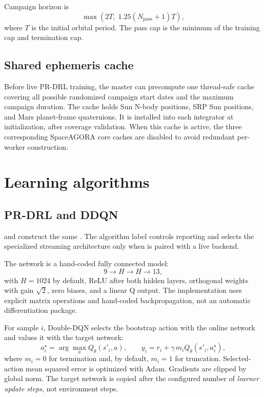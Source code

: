 \documentclass[11pt]{article}
\newcommand{\code}[1]{\texttt{\detokenize{#1}}}
\begin{document}
Campaign horizon is
\[
  \max\!\left(2T,\;1.25(N_{\mathrm{pass}}+1)T\right),
\]
where $T$ is the initial orbital period.  The pass cap is the minimum of the
training cap and termination cap.

\subsection{Shared ephemeris cache}

Before live PR-DRL training, the master can precompute one thread-safe cache
covering all possible randomized campaign start dates and the maximum
campaign duration.  The cache holds Sun N-body positions, SRP Sun positions,
and Mars planet-frame quaternions.  It is installed into each integrator at
initialization, after coverage validation.  When this cache is active, the
three corresponding SpaceAGORA core caches are disabled to avoid redundant
per-worker construction.

\section{Learning algorithms}

\subsection{PR-DRL and DDQN}

\code{pr_drl} and \code{ddqn} construct the same \code{DDQNLearner}.  The
algorithm label controls reporting and selects the specialized streaming
architecture only when \code{pr_drl} is paired with a live backend.

The network is a hand-coded fully connected model:
\[
  9 \longrightarrow H \longrightarrow H \longrightarrow 13,
\]
with $H=1024$ by default, ReLU after both hidden layers, orthogonal weights
with gain $\sqrt{2}$, zero biases, and a linear Q output.  The implementation
uses explicit matrix operations and hand-coded backpropagation, not an
automatic differentiation package.

For sample $i$, Double-DQN selects the bootstrap action with the online
network and values it with the target network:
\[
  a_i^\star=\arg\max_a Q_\theta(s'_i,a),\qquad
  y_i=r_i+\gamma\,m_i Q_{\bar\theta}(s'_i,a_i^\star),
\]
where $m_i=0$ for termination and, by default, $m_i=1$ for truncation.
Selected-action mean squared error is optimized with Adam.  Gradients are
clipped by global norm.  The target network is copied after the configured
number of \emph{learner update steps}, not environment steps.
\end{document}

